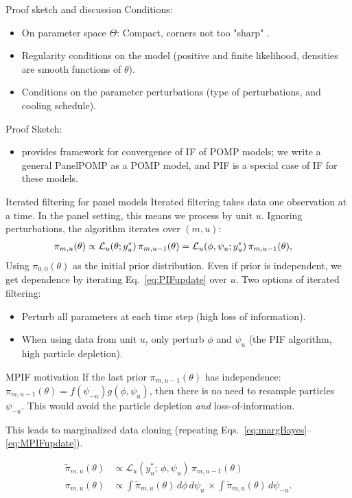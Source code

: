 \documentclass[aspectratio=169]{beamer}\usepackage[]{graphicx}\usepackage[]{xcolor}
\begin{document}
\begin{frame}{Proof sketch and discussion}
  Conditions:
  \begin{itemize}
    \item On parameter space $\Theta$: Compact, corners not too "sharp" \citep[regular compact set, Def~1 of][]{chen24}.
    \item Regularity conditions on the model (positive and finite likelihood, densities are smooth functions of $\theta$). 
    \item Conditions on the parameter perturbations (type of perturbations, and cooling schedule). 
  \end{itemize}
  Proof Sketch: 
  \begin{itemize}
    \item \citet{chen24} provides framework for convergence of IF of POMP models; we write a general PanelPOMP as a POMP model, and PIF is a special case of IF for these models. 
  \end{itemize}
\end{frame}

\begin{frame}{Iterated filtering for panel models}
  Iterated filtering takes data one observation at a time. 
  In the panel setting, this means we process by unit $u$. 
  Ignoring perturbations, the algorithm iterates over $(m, u)$: 
  \begin{align}
    \pi_{m, u}(\theta) &\propto \mathcal{L}_u(\theta; y_u^*)\, \pi_{m, u-1}(\theta) = \mathcal{L}_u(\phi, \psi_u; y_u^*)\, \pi_{m, u-1}(\theta), \label{eq:PIFupdate}
  \end{align}
    Using $\pi_{0, 0}(\theta)$ as the initial prior distribution. Even if prior is independent, we get dependence by iterating Eq.~\ref{eq:PIFupdate} over $u$. Two options of iterated filtering: 
    \begin{itemize}
      \item Perturb all parameters at each time step (high loss of information). 
      \item When using data from unit $u$, only perturb $\phi$ and $\psi_u$ (the PIF algorithm, high particle depletion). 
    \end{itemize}
\end{frame}

\begin{frame}{MPIF motivation}
  If the last prior $\pi_{m, u-1}(\theta)$ has independence: $\pi_{m, u-1}(\theta) = f(\psi_{-u})g(\phi, \psi_{u})$, then there is no need to resample particles $\psi_{-u}$. This would avoid the particle depletion \emph{and} loss-of-information.
  
  This leads to marginalized data cloning (repeating Eqs.~\ref{eq:margBayes}--\ref{eq:MPIFupdate}). 
  
  \begin{align}
\tilde{\pi}_{m, u}(\theta) &\propto \mathcal{L}_{u}(y^*_u;\, \phi, \psi_u)\, \pi_{m, u-1}(\theta) \label{eq:margBayes}\\
\pi_{m, u}(\theta) &\propto \int \! \tilde{\pi}_{m, u}(\theta) \, d\phi \, d\psi_u \, \times \int \! \tilde{\pi}_{m, u}(\theta) \, d\psi_{-u} \label{eq:MPIFupdate}.
\end{align}
\end{frame}
\end{document}
